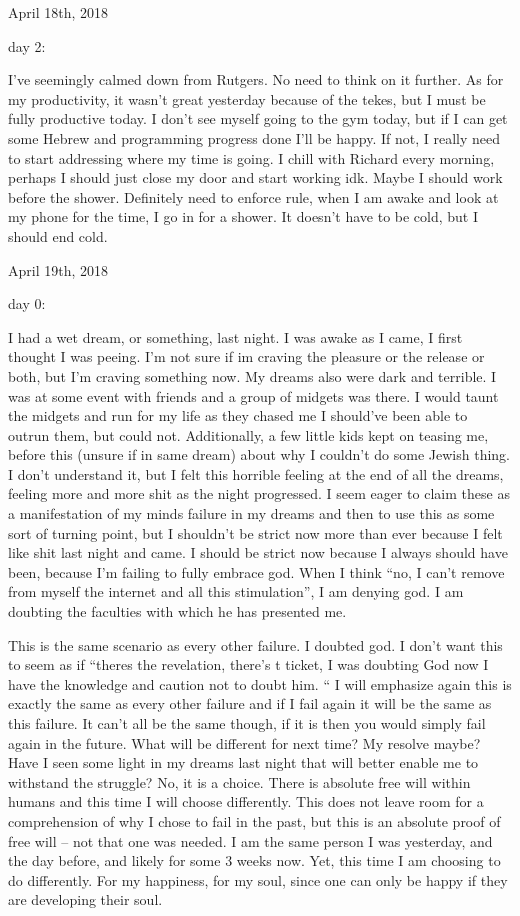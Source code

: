 \bigskip
\bigskip
April 18th, 2018

day 2:

I've seemingly calmed down from Rutgers. No need to think on it further.
As for my productivity, it wasn't great yesterday because of the tekes,
but I must be fully productive today. I don't see myself going to the
gym today, but if I can get some Hebrew and programming progress done
I'll be happy. If not, I really need to start addressing where my time
is going. I chill with Richard every morning, perhaps I should just
close my door and start working idk. Maybe I should work before the
shower. Definitely need to enforce rule, when I am awake and look at my
phone for the time, I go in for a shower. It doesn't have to be cold,
but I should end cold.

\bigskip
\bigskip
April 19th, 2018

day 0:

I had a wet dream, or something, last night. I was awake as I came, I
first thought I was peeing. I'm not sure if im craving the pleasure or
the release or both, but I'm craving something now. My dreams also were
dark and terrible. I was at some event with friends and a group of
midgets was there. I would taunt the midgets and run for my life as they
chased me I should've been able to outrun them, but could not.
Additionally, a few little kids kept on teasing me, before this (unsure
if in same dream) about why I couldn't do some Jewish thing. I don't
understand it, but I felt this horrible feeling at the end of all the
dreams, feeling more and more shit as the night progressed. I seem eager
to claim these as a manifestation of my minds failure in my dreams and
then to use this as some sort of turning point, but I shouldn't be
strict now more than ever because I felt like shit last night and came.
I should be strict now because I always should have been, because I'm
failing to fully embrace god. When I think ``no, I can't remove from
myself the internet and all this stimulation'', I am denying god. I am
doubting the faculties with which he has presented me.

This is the same scenario as every other failure. I doubted god. I don't
want this to seem as if ``theres the revelation, there's t ticket, I was
doubting God now I have the knowledge and caution not to doubt him. `` I
will emphasize again this is exactly the same as every other failure and
if I fail again it will be the same as this failure. It can't all be the
same though, if it is then you would simply fail again in the future.
What will be different for next time? My resolve maybe? Have I seen some
light in my dreams last night that will better enable me to withstand
the struggle? No, it is a choice. There is absolute free will within
humans and this time I will choose differently. This does not leave room
for a comprehension of why I chose to fail in the past, but this is an
absolute proof of free will -- not that one was needed. I am the same
person I was yesterday, and the day before, and likely for some 3 weeks
now. Yet, this time I am choosing to do differently. For my happiness,
for my soul, since one can only be happy if they are developing their
soul.


